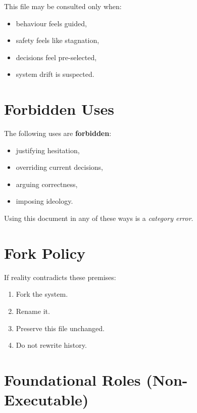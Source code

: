 This file may be consulted only when:

\begin{itemize}
\item behaviour feels guided,
\item safety feels like stagnation,
\item decisions feel pre-selected,
\item system drift is suspected.
\end{itemize}


\section{Forbidden Uses}
\label{sec:foundational-forbidden}

The following uses are \textbf{forbidden}:

\begin{itemize}
\item justifying hesitation,
\item overriding current decisions,
\item arguing correctness,
\item imposing ideology.
\end{itemize}

\noindent
Using this document in any of these ways is a \emph{category error}.

\section{Fork Policy}
\label{sec:foundational-fork}

If reality contradicts these premises:

\begin{enumerate}
\item Fork the system.
\item Rename it.
\item Preserve this file unchanged.
\item Do not rewrite history.
\end{enumerate}

\section{Foundational Roles (Non-Executable)}
\label{sec:foundational-roles}

